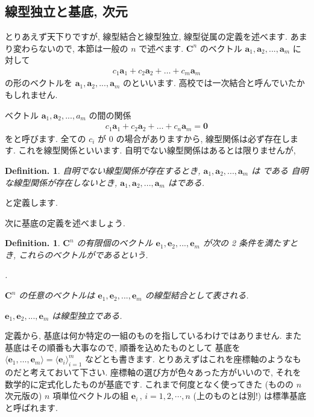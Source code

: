 \documentclass[openany, a4paper, oneside]{book}
\newcounter{enum2}
\renewenvironment{enumerate}{%
\begin{list}%
{%
\arabic{enum2}.\ \,%
}%
{%
\usecounter{enum2}
\setlength{\itemindent}{0pt}%
\setlength{\leftmargin}{6pt}%
\setlength{\rightmargin}{0pt}%
\setlength{\labelsep}{0pt}%
\setlength{\labelwidth}{6pt}%
\setlength{\itemsep}{0pt}%
\setlength{\parsep}{0pt}%
\setlength{\listparindent}{0pt}%
}
}{%
\end{list}%
}
\theoremstyle{break}
\theoremstyle{breakdefn}
\newtheorem{defn}[thm]{Definition.}
\begin{document}
\subsection{線型独立と基底, 次元 \label{sec:basis}}
\label{sec-4-3-2-6}

とりあえず天下りですが, 線型結合と線型独立, 線型従属の定義を述べます.
あまり変わらないので, 本節は一般の $n$ で述べます.
 $\bm{C}^n$ のベクトル $\bm{a}_{1},\bm{a}_{2},...,\bm{a}_{m}$ に対して
    \begin{align}
        c_{1}\bm{a}_{1} + c_{2}\bm{a}_{2} + \dots + c_{m}\bm{a}_{m}
    \end{align}
の形のベクトルを $\bm{a}_{1},\bm{a}_{2},...,\bm{a}_{m}$ のといいます.
高校では一次結合と呼んでいたかもしれません.

ベクトル $\bm{a}_{1},\bm{a}_{2},...,{a}_{m}$ の間の関係
    \begin{align}
        c_{1}\bm{a}_{1} + c_{2}\bm{a}_{2} + \dots + c_{n}\bm{a}_{m} = \bm{0}
    \end{align}
をと呼びます. 全ての $c_{i}$ が $0$ の場合がありますから, 線型関係は必ず存在します.
これを線型関係といいます.
自明でない線型関係はあるとは限りませんが,
    \begin{defn}自明でない線型関係が存在するとき,  $\bm{a}_{1},\bm{a}_{2},...,\bm{a}_{m}$ は
である
自明な線型関係が存在しないとき,  $\bm{a}_{1},\bm{a}_{2},...,\bm{a}_{m}$ はである.
    \end{defn}
と定義します.

次に基底の定義を述べましょう.
    \begin{defn} $\bm{C}^n$ の有限個のベクトル $\bm{e}_{1},\bm{e}_{2},...,\bm{e}_{m}$ が次の 2 条件を満たすとき,
これらのベクトルがであるという.
    \begin{enumerate}
        \item  $\bm{C}^n$ の任意のベクトルは $\bm{e}_{1},\bm{e}_{2},...,\bm{e}_{m}$ の線型結合として表される.
        \item  $\bm{e}_{1},\bm{e}_{2},...,\bm{e}_m$ は線型独立である.
    \end{enumerate}
    \end{defn}
定義から, 基底は何か特定の一組のものを指しているわけではありません.
また基底はその順番も大事なので, 順番を込めたものとして
基底を $\langle \bm{e}_1,\dots,\bm{e}_{m} \rangle = \langle \bm{e}_{i} \rangle _{i=1}^m$ などとも書きます.
とりあえずはこれを座標軸のようなものだと考えておいて下さい.
座標軸の選び方が色々あった方がいいので, それを数学的に定式化したものが基底です.
これまで何度となく使ってきた (ものの $n$ 次元版の) $n$ 項単位ベクトルの組
 $\bm{e}_{i} \, , \, i=1,2,\dotsb,n$ (上のものとは別!) は標準基底と呼ばれます.
\end{document}
